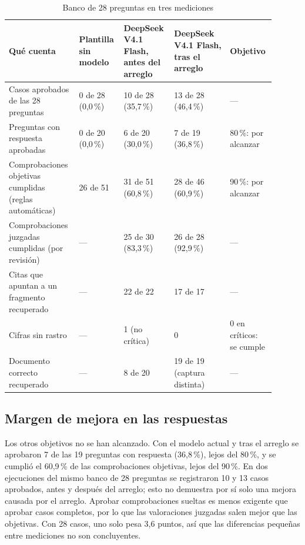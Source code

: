 \begin{table}[htbp]
\centering\small
\caption{Banco de 28 preguntas en tres mediciones}\label{tab-h1}
\begin{tabular}{@{}p{0.25\linewidth}p{0.13\linewidth}p{0.18\linewidth}p{0.2\linewidth}p{0.14\linewidth}@{}}
\toprule
\textbf{Qué cuenta} & \textbf{Plantilla sin modelo} & \textbf{DeepSeek V4.1 Flash, antes del arreglo} & \textbf{DeepSeek V4.1 Flash, tras el arreglo} & \textbf{Objetivo} \\
\midrule
Casos aprobados de las 28 preguntas & 0 de 28 (0,0\,\%) & 10 de 28 (35,7\,\%) & 13 de 28 (46,4\,\%) & --- \\
Preguntas con respuesta aprobadas & 0 de 20 (0,0\,\%) & 6 de 20 (30,0\,\%) & 7 de 19 (36,8\,\%) & 80\,\%: por alcanzar \\
Comprobaciones objetivas cumplidas (reglas automáticas) & 26 de 51 & 31 de 51 (60,8\,\%) & 28 de 46 (60,9\,\%) & 90\,\%: por alcanzar \\
Comprobaciones juzgadas cumplidas (por revisión) & --- & 25 de 30 (83,3\,\%) & 26 de 28 (92,9\,\%) & --- \\
Citas que apuntan a un fragmento recuperado & --- & 22 de 22 & 17 de 17 & --- \\
Cifras sin rastro & --- & 1 (no crítica) & 0 & 0 en críticos: se cumple \\
Documento correcto recuperado & --- & 8 de 20 & 19 de 19 (captura distinta) & --- \\
\bottomrule
\end{tabular}
\end{table}

\subsection{Margen de mejora en las respuestas}\label{h-3}

Los otros objetivos no se han alcanzado. Con el modelo actual y tras el arreglo se aprobaron 7 de las 19 preguntas con respuesta (36,8\,\%), lejos del 80\,\%, y se cumplió el 60,9\,\% de las comprobaciones objetivas, lejos del 90\,\%. En dos ejecuciones del mismo banco de 28 preguntas se registraron 10 y 13 casos aprobados, antes y después del arreglo; esto no demuestra por sí solo una mejora causada por el arreglo. Aprobar comprobaciones sueltas es menos exigente que aprobar casos completos, por lo que las valoraciones juzgadas salen mejor que las objetivas. Con 28 casos, uno solo pesa 3,6 puntos, así que las diferencias pequeñas entre mediciones no son concluyentes.

